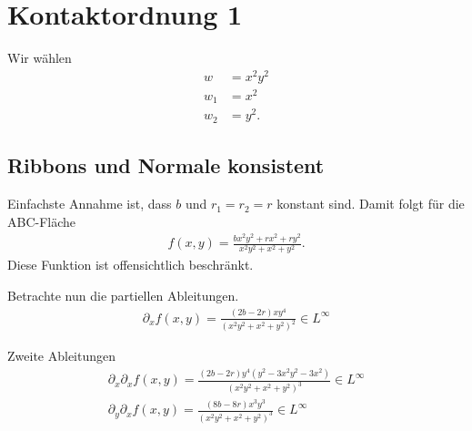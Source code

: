 \documentclass[10pt,a4paper]{report}
\begin{document}
\section{Kontaktordnung 1}
Wir wählen
\begin{align*}
w &= x^2y^2 \\
w_1 &= x^2 \\
w_2 &= y^2.
\end{align*}
\subsection{Ribbons und Normale konsistent}
Einfachste Annahme ist, dass $b$ und $r_1 = r_2 = r$ konstant sind.
Damit folgt für die ABC-Fläche
\begin{align*}
f \left(x, y\right) = \frac{bx^2y^2 + rx^2 + ry^2}{x^2y^2+x^2+y^2}.
\end{align*}
Diese Funktion ist offensichtlich beschränkt.

Betrachte nun die partiellen Ableitungen.
\begin{align*}
\partial_x f \left(x, y\right) = \frac{\left(2b-2r\right) xy^4}{\left(x^2y^2+x^2+y^2\right)^2} \in L^{\infty}
\end{align*}

Zweite Ableitungen
\begin{align*}
\partial_x \partial_x f \left(x, y\right) = \frac{\left(2b-2r\right) y^4 \left(y^2-3x^2y^2-3x^2\right)}{\left(x^2y^2+x^2+y^2\right)^3} \in L^{\infty} \\
\partial_y \partial_x f \left(x, y\right) = \frac{\left(8b-8r\right) x^3y^3}{\left(x^2y^2+x^2+y^2\right)^3} \in L^{\infty}
\end{align*}
\end{document}
